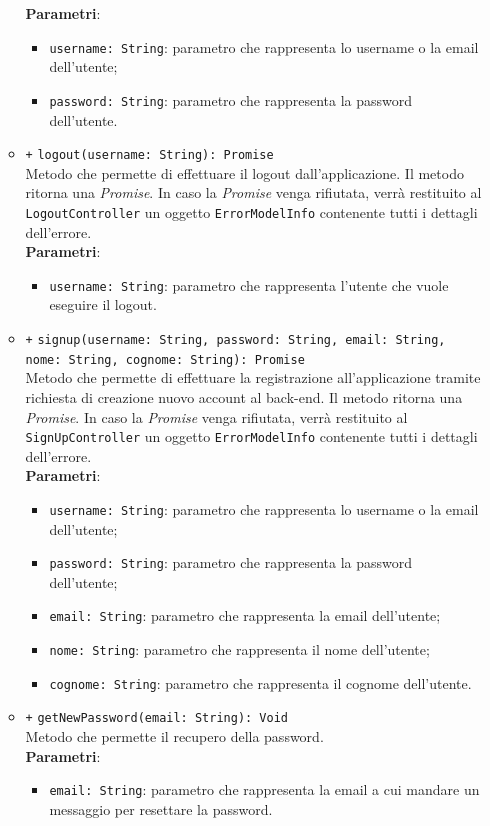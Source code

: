 \begin{itemize}
\begin{itemize}
			\textbf{Parametri}: 
			\begin{itemize}
				\item \texttt{username: String}: parametro che rappresenta lo username o la email dell'utente;
				\item \texttt{password: String}: parametro che rappresenta la password dell'utente.
			\end{itemize}
		\item \texttt{+} \texttt{logout(username: String): Promise} \\ Metodo che permette di effettuare il logout dall'applicazione. Il metodo ritorna una \textit{Promise}. In caso la \textit{Promise} venga rifiutata, verrà restituito al \texttt{LogoutController} un oggetto \texttt{ErrorModelInfo} contenente tutti i dettagli dell'errore. \\
		\textbf{Parametri}:
		\begin{itemize}
			\item \texttt{username: String}: parametro che rappresenta l'utente che vuole eseguire il logout.
		\end{itemize}
		\item \texttt{+} \texttt{signup(username: String, password: String, email: String, nome: String, cognome: String): Promise} \\Metodo che permette di effettuare la registrazione all'applicazione tramite richiesta di creazione nuovo account al back-end. Il metodo ritorna una \textit{Promise}. In caso la \textit{Promise} venga rifiutata, verrà restituito al \texttt{SignUpController} un oggetto \texttt{ErrorModelInfo} contenente tutti i dettagli dell'errore. \\
			\textbf{Parametri}:
			\begin{itemize}
				\item \texttt{username: String}: parametro che rappresenta lo username o la email dell'utente;
				\item \texttt{password: String}: parametro che rappresenta la password dell'utente;
				\item \texttt{email: String}: parametro che rappresenta la email dell'utente;
				\item \texttt{nome: String}: parametro che rappresenta il nome dell'utente;
				\item \texttt{cognome: String}: parametro che rappresenta il cognome dell'utente.
			\end{itemize}
		\item \texttt{+} \texttt{getNewPassword(email: String): Void}  \\Metodo che permette il recupero della password. \\
			\textbf{Parametri}:
			\begin{itemize}
				\item \texttt{email: String}: parametro che rappresenta la email a cui mandare un messaggio per resettare la password.
			\end{itemize}
	\end{itemize}
\end{itemize}


